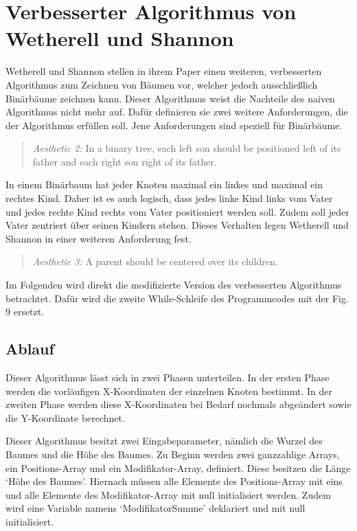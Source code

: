 
\section{Verbesserter Algorithmus von Wetherell und Shannon}
\label{chap:kapitel3_2}
Wetherell und Shannon stellen in ihrem Paper einen weiteren, verbesserten Algorithmus zum Zeichnen von Bäumen vor, welcher jedoch
ausschließlich Binärbäume zeichnen kann. Dieser Algorithmus weist die Nachteile des naiven Algorithmus nicht mehr auf.
Dafür definieren sie zwei weitere Anforderungen, die der Algorithmus erfüllen soll. Jene Anforderungen sind speziell für Binärbäume.   

\begin{quotation}
	\textit{Aesthetic 2:} In a binary tree, each left son should be positioned
	left of its father and each right son right of its father.\cite[]{q1}
\end{quotation}

In einem Binärbaum hat jeder Knoten maximal ein linkes und maximal ein rechtes Kind. Daher ist es auch logisch, dass jedes linke Kind 
links vom Vater und jedes rechte Kind rechts vom Vater positioniert werden soll. Zudem soll jeder Vater zentriert über seinen Kindern
stehen. Dieses Verhalten legen Wetherell und Shannon in einer weiteren Anforderung fest.

\begin{quotation}
	\textit{Aesthetic 3:} A parent should be centered over its children.\cite[]{q1}
\end{quotation}

Im Folgenden wird direkt die modifizierte Version des verbesserten Algorithmus betrachtet. Dafür wird die zweite While-Schleife des Programmcodes
mit der Fig. 9 \cite[A modification of Algorithm 3]{q1} ersetzt.

\label{chap:kapitel3_2_Ablauf}
\subsection{Ablauf}

Dieser Algorithmus lässt sich in zwei Phasen unterteilen. In der ersten Phase werden die vorläufigen X-Koordinaten der einzelnen Knoten bestimmt.
In der zweiten Phase werden diese X-Koordinaten bei Bedarf nochmals abgeändert sowie die Y-Koordinate berechnet.

Dieser Algorithmus besitzt zwei Eingabeparameter, nämlich die Wurzel des Baumes und die Höhe des Baumes. Zu Beginn werden zwei
ganzzahlige Arrays, ein Positions-Array und ein Modifikator-Array, definiert. Diese besitzen die Länge ‘Höhe des Baumes’.
Hiernach müssen alle Elemente des Positions-Array mit eins und alle Elemente des Modifikator-Array mit null initialisiert werden.
Zudem wird eine Variable namens ‘ModifikatorSumme’ deklariert und mit null initialisiert.

